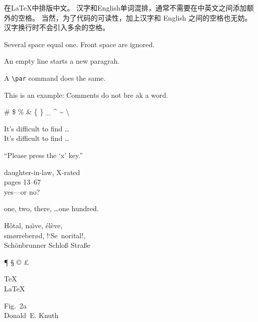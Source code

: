 \documentclass{ctexart}
\begin{document}
在\LaTeX{}中排版中文。
汉字和English单词混排，通常不需要在中英文之间添加额外的空格。
当然，为了代码的可读性，加上汉字和 English 之间的空格也无妨。
汉字换行时不会引入多余的空格。

Several space    equal one.
    Front space are ignored.

An empty line starts a new paragrah.\par
A \verb|\par| command does the same.

This is an %
example: Comments do not bre%
ak a word.

\# \$ \% \& \{ \} \_
\^{} \~{} \textbackslash

It's difficult to find \ldots\\
It's dif{}f{}icult to f{}ind \ldots

``Please press the `x' key.''

daughter-in-law, X-rated\\
pages 13--67\\
yes---or no?

one, two, there, \ldots one hundred.

H\^otal, na\"\i ve, \'el\`eve,\\
sm\o rreber\o d, !`Se\ norital!,\\
Sch\"onbrunner Schlo\ss{}
Stra\ss e

\P{} \S{} \dag{} \ddag{}
\copyright{} \pounds{}

\textasteriskcentered
\textperiodcentered
\textbullet

\textregistered{} \texttrademark


\TeX\\
\LaTeX\\
\LaTeXe


Fig.~2a \\
Donald~E. Knuth

\end{document}
